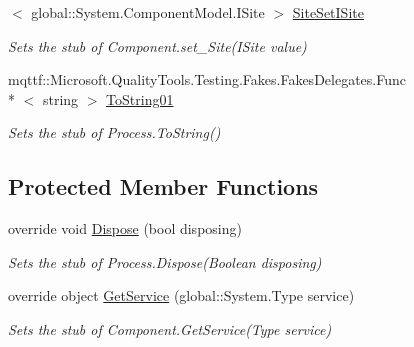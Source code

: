 \begin{DoxyCompactItemize}
$<$ global\-::\-System.\-Component\-Model.\-I\-Site $>$ \hyperlink{class_system_1_1_diagnostics_1_1_fakes_1_1_stub_process_acd6cc4acb34074aee3a0b30a3b044f4b}{Site\-Set\-I\-Site}
\begin{DoxyCompactList}\small\item\em Sets the stub of Component.\-set\-\_\-\-Site(\-I\-Site value)\end{DoxyCompactList}\item 
mqttf\-::\-Microsoft.\-Quality\-Tools.\-Testing.\-Fakes.\-Fakes\-Delegates.\-Func\\*
$<$ string $>$ \hyperlink{class_system_1_1_diagnostics_1_1_fakes_1_1_stub_process_a2e246d8b5bd2003096a05778cf4b5056}{To\-String01}
\begin{DoxyCompactList}\small\item\em Sets the stub of Process.\-To\-String()\end{DoxyCompactList}\end{DoxyCompactItemize}
\subsection*{Protected Member Functions}
\begin{DoxyCompactItemize}
\item 
override void \hyperlink{class_system_1_1_diagnostics_1_1_fakes_1_1_stub_process_ab44266ac883fe422c296e0cb71257599}{Dispose} (bool disposing)
\begin{DoxyCompactList}\small\item\em Sets the stub of Process.\-Dispose(\-Boolean disposing)\end{DoxyCompactList}\item 
override object \hyperlink{class_system_1_1_diagnostics_1_1_fakes_1_1_stub_process_a886fcc0fa996cae740dae7db1b8e14dd}{Get\-Service} (global\-::\-System.\-Type service)
\begin{DoxyCompactList}\small\item\em Sets the stub of Component.\-Get\-Service(\-Type service)\end{DoxyCompactList}\end{DoxyCompactItemize}

